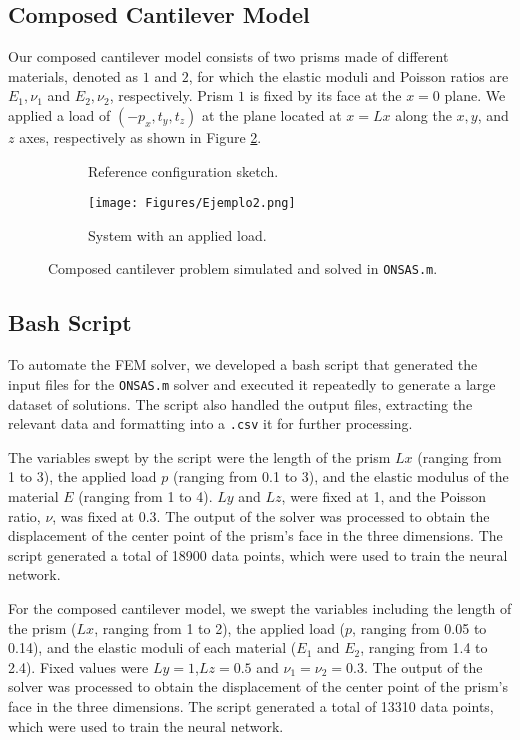 \documentclass[oneside,a4paper,english,links]{amca}
\begin{document}
\subsection{Composed Cantilever Model}
Our composed cantilever model consists of two prisms made of different materials, denoted as $1$ and $2$, for which the elastic moduli and Poisson ratios are $E_1, \nu_1$ and $E_2, \nu_2$, respectively. Prism $1$ is fixed by its face at the $x=0$ plane. We applied a load of $(-p_x, t_y, t_z)$ at the plane located at $x=Lx$ along the $x, y$, and $z$ axes, respectively as shown in Figure \ref{fig:composed_cantilever_model}.

\begin{figure}[ht]
	\centering
	\begin{subfigure}[b]{0.48\textwidth}
	\def\svgwidth{\textwidth}
	
	\caption{Reference configuration sketch.}
	\label{fig:ex1_ilus}
	\end{subfigure}
	\hfill
	\begin{subfigure}[b]{0.48\textwidth}
	\centering
	\texttt{[image: Figures/Ejemplo2.png]}
	\caption{System with an applied load.}
	\end{subfigure}
	\caption{Composed cantilever problem simulated and solved in \texttt{ONSAS.m}.}
	\label{fig:composed_cantilever_model}
\end{figure}


\subsection{Bash Script}
To automate the FEM solver, we developed a bash script that generated the input files for the \texttt{ONSAS.m} solver and executed it repeatedly to generate a large dataset of solutions. The script also handled the output files, extracting the relevant data and formatting into a \texttt{.csv} it for further processing.

The variables swept by the script were the length of the prism $Lx$ (ranging from 1 to 3), the applied load $p$ (ranging from 0.1 to 3), and the elastic modulus of the material $E$ (ranging from 1 to 4). $Ly$ and $Lz$, were fixed at 1, and the Poisson ratio, $\nu$, was fixed at 0.3. The output of the solver was processed to obtain the displacement of the center point of the prism's face in the three dimensions.  The script generated a total of 18900 data points, which were used to train the neural network.

For the composed cantilever model, we swept the variables including the length of the prism ($Lx$, ranging from 1 to 2), the applied load ($p$, ranging from 0.05 to 0.14), and the elastic moduli of each material ($E_1$ and $E_2$, ranging from 1.4 to 2.4). Fixed values were $Ly=1$,$Lz=0.5$ and  $\nu_1=\nu_2=0.3$. The output of the solver was processed to obtain the displacement of the center point of the prism's face in the three dimensions. The script generated a total of 13310 data points, which were used to train the neural network.
\end{document}
